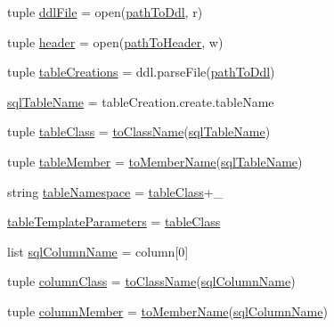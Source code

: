 \begin{DoxyCompactItemize}
\item 
tuple \hyperlink{namespaceddl2cpp_a6a08f77749b6af650691eaa476716dbf}{ddl\+File} = open(\hyperlink{namespaceddl2cpp_a21ffb333ce42da19ce242bfe204b34cc}{path\+To\+Ddl}, \textquotesingle{}r\textquotesingle{})
\item 
tuple \hyperlink{namespaceddl2cpp_af8987a7b7aa171a62a294d565d63504f}{header} = open(\hyperlink{namespaceddl2cpp_a9098aa495b84a1827935d4d3068775dd}{path\+To\+Header}, \textquotesingle{}w\textquotesingle{})
\item 
tuple \hyperlink{namespaceddl2cpp_a776ec4c34c9e0a9657d5bf69b48d7af8}{table\+Creations} = ddl.\+parse\+File(\hyperlink{namespaceddl2cpp_a21ffb333ce42da19ce242bfe204b34cc}{path\+To\+Ddl})
\item 
\hyperlink{namespaceddl2cpp_ab7475b2e13b9191674fa194059e34fd3}{sql\+Table\+Name} = table\+Creation.\+create.\+table\+Name
\item 
tuple \hyperlink{namespaceddl2cpp_a02f88bd22a70bc696974c61fb718a231}{table\+Class} = \hyperlink{namespaceddl2cpp_a171a1c72b1455718e3fcfb822535f3ed}{to\+Class\+Name}(\hyperlink{namespaceddl2cpp_ab7475b2e13b9191674fa194059e34fd3}{sql\+Table\+Name})
\item 
tuple \hyperlink{namespaceddl2cpp_af01677d026a7e6ca36b20121ad0a3c80}{table\+Member} = \hyperlink{namespaceddl2cpp_a72093c250c34f27e4fc18e8374c7b1d8}{to\+Member\+Name}(\hyperlink{namespaceddl2cpp_ab7475b2e13b9191674fa194059e34fd3}{sql\+Table\+Name})
\item 
string \hyperlink{namespaceddl2cpp_a1b72644ae79adb19e5e0fc6134cf375b}{table\+Namespace} = \hyperlink{namespaceddl2cpp_a02f88bd22a70bc696974c61fb718a231}{table\+Class}+\textquotesingle{}\+\_\+\textquotesingle{}
\item 
\hyperlink{namespaceddl2cpp_a191322d8af5b19a0af69d0eaa33436ee}{table\+Template\+Parameters} = \hyperlink{namespaceddl2cpp_a02f88bd22a70bc696974c61fb718a231}{table\+Class}
\item 
list \hyperlink{namespaceddl2cpp_a4172a520f4c7f16bb27ba4cdc3a440e6}{sql\+Column\+Name} = column\mbox{[}0\mbox{]}
\item 
tuple \hyperlink{namespaceddl2cpp_a888fd7048ed5ce41168263718a5d713a}{column\+Class} = \hyperlink{namespaceddl2cpp_a171a1c72b1455718e3fcfb822535f3ed}{to\+Class\+Name}(\hyperlink{namespaceddl2cpp_a4172a520f4c7f16bb27ba4cdc3a440e6}{sql\+Column\+Name})
\item 
tuple \hyperlink{namespaceddl2cpp_a2772f4aa8123b99ace6d69e5ad9fea51}{column\+Member} = \hyperlink{namespaceddl2cpp_a72093c250c34f27e4fc18e8374c7b1d8}{to\+Member\+Name}(\hyperlink{namespaceddl2cpp_a4172a520f4c7f16bb27ba4cdc3a440e6}{sql\+Column\+Name})

\end{DoxyCompactItemize}
